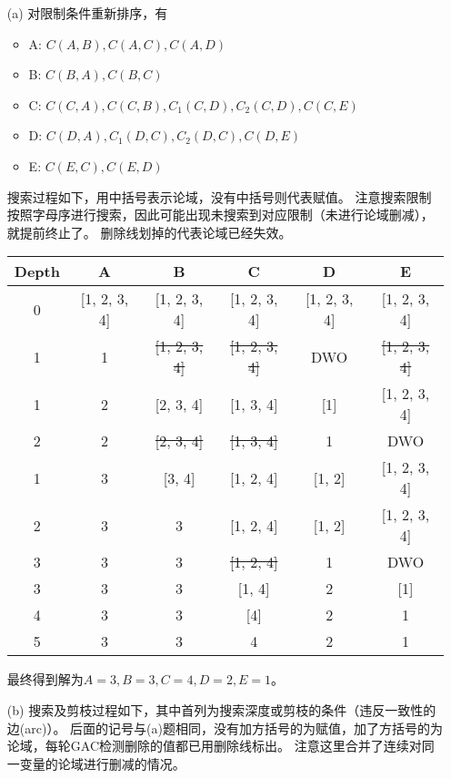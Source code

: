 \documentclass[a4paper, 11pt]{article}
\begin{document}
\begin{answer}
\begin{itemize}
\item [(a)] 对限制条件重新排序，有
\begin{itemize}
    \item A: $C(A,B),C(A,C),C(A,D)$
    \item B: $C(B,A),C(B,C)$
    \item C: $C(C,A),C(C,B),C_1(C,D),C_2(C,D),C(C,E)$
    \item D: $C(D,A),C_1(D,C),C_2(D,C),C(D,E)$
    \item E: $C(E,C),C(E,D)$
\end{itemize}
搜索过程如下，用中括号表示论域，没有中括号则代表赋值。
注意搜索限制按照字母序进行搜索，因此可能出现未搜索到对应限制（未进行论域删减），就提前终止了。
删除线划掉的代表论域已经失效。

\begin{longtable}{|c|c|c|c|c|c|}\hline
    Depth & A & B & C & D & E \\\hline
    0 & [1, 2, 3, 4] & [1, 2, 3, 4] & [1, 2, 3, 4] & [1, 2, 3, 4] & [1, 2, 3, 4]\\\hline
    1 & 1 & \sout{[1, 2, 3, 4]} & \sout{[1, 2, 3, 4]} & DWO & \sout{[1, 2, 3, 4]}\\ \hline
    1 & 2 & [2, 3, 4] & [1, 3, 4] & [1] & [1, 2, 3, 4]\\ \hline
    2 & 2 & \sout{[2, 3, 4]} & \sout{[1, 3, 4]} & 1 & DWO\\ \hline
    1 & 3 & [3, 4] & [1, 2, 4] & [1, 2] & [1, 2, 3, 4]\\ \hline
    2 & 3 & 3 & [1, 2, 4] & [1, 2] & [1, 2, 3, 4]\\ \hline
    3 & 3 & 3 & \sout{[1, 2, 4]} & 1 & DWO\\ \hline
    3 & 3 & 3 & [1, 4] & 2 & [1]\\ \hline
    4 & 3 & 3 & [4] & 2 & 1\\ \hline
    5 & 3 & 3 & 4 & 2 & 1\\ \hline
\end{longtable}

最终得到解为$A=3,B=3,C=4,D=2,E=1$。
\item [(b)]
搜索及剪枝过程如下，其中首列为搜索深度或剪枝的条件（违反一致性的边(arc)）。
后面的记号与(a)题相同，没有加方括号的为赋值，加了方括号的为论域，每轮GAC检测删除的值都已用删除线标出。
注意这里合并了连续对同一变量的论域进行删减的情况。


\end{itemize}
\end{answer}
\end{document}
